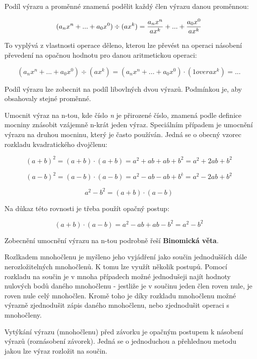 Podíl výrazu a proměnné znamená podělit každý člen výrazu danou proměnnou:

$$ (a_{n}x^{n}+...+a_0x^{0}) \div (ax^{k}) = {{a_nx^{n}}\over{ax^{k}}}+...+{{a_{0}x^{0}}\over{ax^{k}}} $$

To vyplývá z vlastnosti operace děleno, kterou lze převést na operaci násobení převedení na opačnou hodnotu pro danou aritmetickou operaci:

$$(a_{n}x^{n}+...+a_0x^{0}) \div (ax^{k}) = (a_{n}x^{n}+...+a_0x^{0}) \cdot ({1} over {ax^{k}}) = ...  $$


Podíl výrazu lze zobecnit na podíl libovlných dvou výrazů. Podmínkou je, aby obsahovaly stejné proměnné.


Umocnit výraz na n-tou, kde číslo {\it n} je přirozené číslo, znamená podle definice mocniny znásobit vzájemně n-krát jeden výraz. Speciálním případem je umocnění výrazu na druhou mocninu, který je často používán. Jedná se o obecný vzorec rozkladu kvadratického dvojčlenu:

$$ (a + b)^2 = (a + b) \cdot (a + b) = a^2 + ab + ab + b^2 = a^2 +2ab +b^2 $$

$$ (a-b)^2 = (a-b) \cdot (a-b) = a^2 -ab -ab +b^ě = a^2 -2ab + b^2 $$

$$ a^2-b^2 = (a + b) \cdot (a-b) $$

Na důkaz této rovnosti je třeba použít opačný postup:

$$ (a + b) \cdot (a-b) = a^2 -ab +ab -b^2 = a^2-b^2 $$

Zobecnění umocnění výrazu na n-tou podrobně řeší {\bf Binomická věta}.


Rozlkadem mnohočlenu je myšleno jeho vyjádření jako součin jednodušších dále nerozložitelných mnohočlenů. K tomu lze využít několik postupů. Pomocí rozkladu na součin je v mnoha případech možné jednodušeji najít hodnoty nulových bodů daného mnohočlenu - jestliže je v součinu jeden člen roven nule, je roven nule celý mnohočlen. Kromě toho je díky rozkladu mnohočlenu možné výrazně zjednodušit zápis daného mnohočlenu, nebo zjednodušit operaci s mnohočleny.


Vytýkání výrazu (mnohočlenu) před závorku je opačným postupem k násobení výrazů (roznásobení závorek). Jedná se o jednoduchou a přehlednou metodu jakou lze výraz rozložit na součin. 

